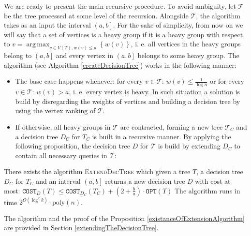 \documentclass[a4paper, anonymous, numberwithinsect, pdfa, UKenglish,cleveref, autoref, thm-restate]{socg-lipics-v2021}
\newcommand{\br}[1]{\left( #1 \right)}
\newcommand{\brc}[1]{\left\{ #1 \right\}}
\newcommand{\OPT}{\texttt{OPT}}
\newcommand{\COST}{\texttt{COST}}
\newcommand{\argmax}{\operatorname*{arg\,max}}
\begin{document}
We are ready to present the main recursive procedure. To avoid ambiguity, let $\mathcal{T}$ be the tree processed at some level of the recursion. Alongside $\mathcal{T}$, the algorithm takes as an input the interval $\left(a,b\right]$. For the sake of simplicity, from now on we will say that a set of vertices is a heavy group if it is a heavy group with respect to $v=\argmax_{v\in V\br{T}, w\br{v}\leq a}\brc{w(v)}$, i. e. all vertices in the heavy groups belong to $\left(a,b\right]$ and every vertex in $\left(a,b\right]$ belongs to some heavy group. The algorithm (see Algorithm \ref{createDecisionTree}) works in the following manner: 
\begin{itemize}
    \item The base case happens whenever: for every $v\in\mathcal{T}$: $w\br{v}\leq\frac{1}{\log n}$ or for every $v\in\mathcal{T}$: $w\br{v}>a$, i. e. every vertex is heavy. In such situation a solution is build by disregarding the weights of vertices and building a decision tree by using the vertex ranking of $\mathcal{T}$. 
    \item If otherwise, all heavy groups in $\mathcal{T}$ are contracted, forming a new tree $\mathcal{T}_C$ and a decision tree $D_{C}$ for $T_C$ is built in a recursive manner. By applying the following proposition, the decision tree $D$ for $\mathcal{T}$ is build by extending $D_{C}$ to contain all necessary queries in $\mathcal{T}$:
\end{itemize}
\begin{proposition}
\label{existanceOfExtensionAlgorithm}
There exists the algorithm \textsc{ExtendDecTree} which given a tree $T$, a decision tree $D_C$ for $T_C$ and an interval $\left(a,b\right]$ returns a new decision tree $D$ with cost at most:
$
\COST_{D}\br{T}\leq \COST_{D_C}\br{T_C}+\br{2+\frac{b}{a}}\cdot\OPT\br{T}
$
The algorithm runs in time 
$2^{O\br{\log^2k}}\cdot\text{poly}\br{n}$.   
\end{proposition}

The algorithm and the proof of the Proposition \ref{existanceOfExtensionAlgorithm} are provided in Section \ref{extendingTheDecisionTree}. 
\end{document}
